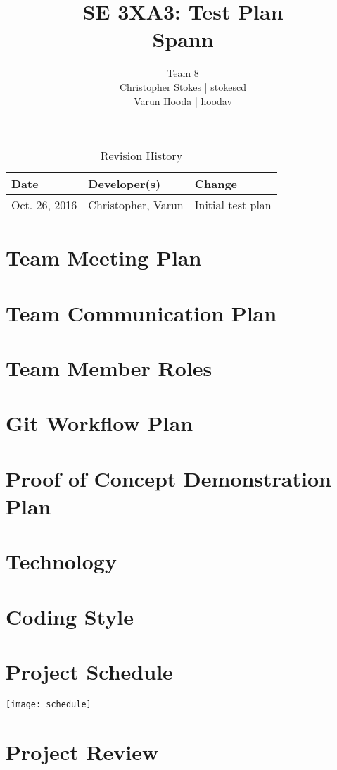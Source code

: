 \documentclass{article}
\title{SE 3XA3: Test Plan\\Spann}
\author{Team 8
		\\ Christopher Stokes | stokescd
		\\ Varun Hooda | hoodav
}
\date{}
\begin{document}
\begin{table}[hp]
\caption{Revision History} \label{TblRevisionHistory}
\begin{tabularx}{\textwidth}{llX}
\toprule
\textbf{Date} & \textbf{Developer(s)} & \textbf{Change}\\
\midrule
    Oct. 26, 2016 & Christopher, Varun & Initial test plan\\
\bottomrule
\end{tabularx}
\end{table}

\newpage

\maketitle

\section{Team Meeting Plan}

\section{Team Communication Plan}

\section{Team Member Roles}

\section{Git Workflow Plan}

\section{Proof of Concept Demonstration Plan}

\section{Technology}

\section{Coding Style}

\section{Project Schedule}

\texttt{[image: schedule]}

\section{Project Review}
\end{document}
